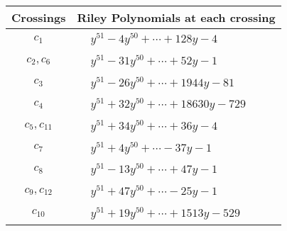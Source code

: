 \documentclass[1p]{elsarticle_modified}
\theoremstyle{definition}
\begin{document}
\begin{tabular}{m{50pt}|m{274pt}}
Crossings & \hspace{64pt}Riley Polynomials at each crossing \\
\hline $$\begin{aligned}c_{1}\end{aligned}$$&$\begin{aligned}
&y^{51}-4 y^{50}+\cdots+128 y-4
\end{aligned}$\\
\hline $$\begin{aligned}c_{2},c_{6}\end{aligned}$$&$\begin{aligned}
&y^{51}-31 y^{50}+\cdots+52 y-1
\end{aligned}$\\
\hline $$\begin{aligned}c_{3}\end{aligned}$$&$\begin{aligned}
&y^{51}-26 y^{50}+\cdots+1944 y-81
\end{aligned}$\\
\hline $$\begin{aligned}c_{4}\end{aligned}$$&$\begin{aligned}
&y^{51}+32 y^{50}+\cdots+18630 y-729
\end{aligned}$\\
\hline $$\begin{aligned}c_{5},c_{11}\end{aligned}$$&$\begin{aligned}
&y^{51}+34 y^{50}+\cdots+36 y-4
\end{aligned}$\\
\hline $$\begin{aligned}c_{7}\end{aligned}$$&$\begin{aligned}
&y^{51}+4 y^{50}+\cdots-37 y-1
\end{aligned}$\\
\hline $$\begin{aligned}c_{8}\end{aligned}$$&$\begin{aligned}
&y^{51}-13 y^{50}+\cdots+47 y-1
\end{aligned}$\\
\hline $$\begin{aligned}c_{9},c_{12}\end{aligned}$$&$\begin{aligned}
&y^{51}+47 y^{50}+\cdots-25 y-1
\end{aligned}$\\
\hline $$\begin{aligned}c_{10}\end{aligned}$$&$\begin{aligned}
&y^{51}+19 y^{50}+\cdots+1513 y-529
\end{aligned}$\\
\hline
\end{tabular}\\~\\
\end{document}
